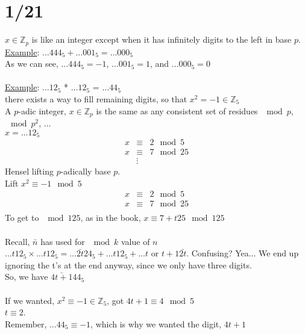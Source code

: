 \section*{1/21}
  $x \in \mathbb{Z}_p$ is like an integer except when it has infinitely
  digits to the left in base $p$.\\
  \underline{Example}: $\ldots 444_5 + \ldots 001_5 = \ldots 000_5$\\
  As we can see, $\ldots 444_5 = -1$, $\ldots 001_5 = 1$, and $\ldots 000_5 = 
  0$\\\\
  \underline{Example}: $\ldots 12_5$ * $\ldots 12_5$ = $\ldots 44_5$\\
  there exists a way to fill remaining digits, so that $x^2 = -1 \in 
  \mathbb{Z}_5$\\
  A  $p$-adic integer, $x \in \mathbb{Z}_p$ is the same as any consistent
  set of residues $\mod p$, $\mod p^2$, $\ldots$\\
  $x = \ldots 12_5$\\
  \begin{eqnarray*}
    x &\equiv& 2 \mod 5 \\
    x &\equiv& 7 \mod 25 \\
    &\vdots&
  \end{eqnarray*}
  Hensel lifting $p$-adically base $p$.\\
  Lift $x^2 \equiv -1 \mod 5$\\
  \begin{eqnarray*}
    x &\equiv& 2 \mod 5\\
    x &\equiv& 7 \mod 25\\
  \end{eqnarray*}
  To get to $\mod 125$, as in the book, $x \equiv 7 + t25 \mod 125$\\\\
  Recall, $\bar{n}$ has used for $\mod k$ value of $n$\\
  $\ldots t12_5 \times \ldots t12_5 = \ldots \bar{2t}24_5 + \ldots t12_5 + 
  \ldots t \text{ or } t+1 \bar{2t}$. Confusing? Yea... We end up
  ignoring the t's at the end anyway, since we only have three digits.\\
  So, we have $\bar{4t+1}44_5$\\\\
  If we wanted, $x^2 \equiv -1 \in \mathbb{Z}_5$, got $4t+1 \equiv 4 \mod 5$\\
  $t \equiv 2$.\\
  Remember, $\ldots 44_5 \equiv -1$, which is why we wanted the digit, $4t+1$
